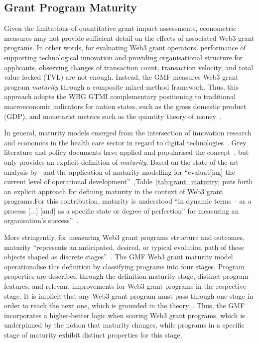 \documentclass[conference]{IEEEtran}
\begin{document}
\subsection{Grant Program Maturity}

Given the limitations of quantitative grant impact assessments, econometric measures may not provide sufficient detail on the effects of associated Web3 grant programs. In other words, for evaluating Web3 grant operators' performance of supporting technological innovation and providing organisational structure for applicants, observing changes of transaction count, transaction velocity, and total value locked (TVL) are not enough. Instead, the GMF measures Web3 grant program \textit{maturity} through a composite mixed-method framework. Thus, this approach adopts the WBG GTMI complementary positioning to traditional macroeconomic indicators for nation states, such as the gross domestic product (GDP), and monetarist metrics such as the quantity theory of money~\cite{sun_understanding_2004}.

In general, maturity models emerged from the intersection of innovation research and economics in the health care sector in regard to digital technologies~\cite{van_ede_assembling_2024,knosp_research_2018}. Grey literature and policy documents have applied and popularised the concept~\cite[see also]{dener_govtech_2021,queensland_audit_office_risk_2023}, but only \cite{kucinska-landwojtowicz_organizational_2023} provides an explicit definition of \textit{maturity}. Based on the state-of-the-art analysis by~\cite{kucinska-landwojtowicz_organizational_2023} and the application of maturity modelling for ``evaluat[ing] the current level of operational development''~\cite{yatskovskaya_integrated_2018},Table~\ref{tab:grant_maturity} puts forth an explicit approach for defining maturity in the context of Web3 grant programs.For this contribution, maturity is understood ``in dynamic terms – as a process [...] [and] as a specific state or degree of perfection'' for measuring an organisation's success''~\cite[p.~62]{kucinska-landwojtowicz_organizational_2023}.

More stringently, for measuring Web3 grant programs structure and outcomes, maturity ``represents an anticipated, desired, or typical evolution path of these objects shaped as discrete stages''~\cite[p.~213]{becker_developing_2009}. The GMF Web3 grant maturity model operationalise this definition by classifying programs into four stages. Program properties are described through the definition maturity stage, distinct program features, and relevant improvements for Web3 grant programs in the respective stage. It is implicit that any Web3 grant program must pass through one stage in order to reach the next one, which is grounded in the theory~\cite{yatskovskaya_integrated_2018}. Thus, the GMF incorporates a higher-better logic when scoring Web3 grant programs, which is underpinned by the notion that maturity changes, while programs in a specific stage of maturity exhibit distinct properties for this stage.
\end{document}

